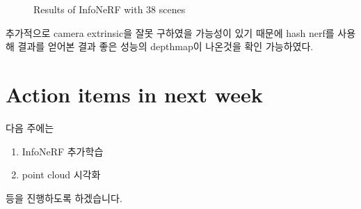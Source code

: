 \documentclass{vipweekly}
\begin{document}
\begin{figure}[h]
    \caption{Results of InfoNeRF with 38 scenes}
    \label{fig:Results}
\end{figure}

추가적으로 camera extrinsic을 잘못 구하였을 가능성이 있기 때문에
hash nerf를 사용해 결과를 얻어본 결과 좋은 성능의 depthmap이 나온것을 확인 가능하였다. 





\section*{Action items in next week}	%
다음 주에는 
\begin{enumerate}
    \item InfoNeRF 추가학습
    \item point cloud 시각화 
\end{enumerate}
등을 진행하도록 하겠습니다.

 
 
\end{document}
